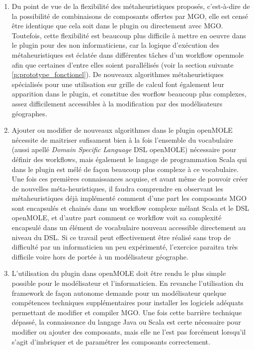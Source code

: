 \begin{enumerate}[label=(\arabic*)]
\item Du point de vue de la flexibilité des métaheuristiques proposés, c'est-à-dire de la possibilité de combinaisons de composants offertes par MGO, elle est censé être identique que cela soit dans le plugin ou directement avec MGO. Toutefois, cette flexibilité est beaucoup plus difficile à mettre en oeuvre dans le plugin pour des non informaticiens, car la logique d'exécution des métaheuristiques est éclatée dans différentes tâches d'un workflow openmole afin que certaines d'entre elles soient parallélisés (voir la section suivante \ref{p:prototype_fonctionel}). De nouveaux algorithmes métaheuristiques spécialisés pour une utilisation sur grille de calcul font également leur apparition dans le plugin, et constitue des worflow beaucoup plus complexes, assez difficilement accessibles à la modification par des modélisateurs géographes.

\item Ajouter ou modifier de nouveaux algorithmes dans le plugin openMOLE nécessite de maitriser sufisament bien à la fois l'ensemble du vocabulaire (aussi apellé \textit{Domain Specific Language} DSL openMOLE) nécessaire pour définir des workflows, mais également le langage de programmation Scala qui dans le plugin est mélé de façon beaucoup plus complexe à ce vocabulaire. Une fois ces premières connaissances acquise, et avant même de pouvoir créer de nouvelles méta-heuristiques, il faudra comprendre en observant les métaheuristiques déjà implémenté comment d'une part les composants MGO sont encapsulés et chainés dans un workflow complexe mélant Scala et le DSL openMOLE, et d'autre part comment ce workflow voit sa complexité encapsulé dans un élément de vocabulaire nouveau accessible directement au niveau du DSL. Si ce travail peut effectivement être réalisé sans trop de difficulté par un informaticien un peu expérimenté, l'exercice paraitra très difficile voire hors de portée à un modélisateur géographe.

\item L'utilisation du plugin dans openMOLE doit être rendu le plus simple possible pour le modélisateur et l'informaticien. En revanche l'utilisation du framework de façon autonome demande pour un modélisateur quelque compétences techniques supplémentaires pour installer les logiciels adéquats permettant de modifier et compiler MGO. Une fois cette barrière technique dépassé, la connaissance du langage Java ou Scala est certe nécessaire pour modifier ou ajouter des composants, mais elle ne l'est pas forcément lorsqu'il s'agit d'imbriquer et de paramétrer les composants correctement.

\end{enumerate}


